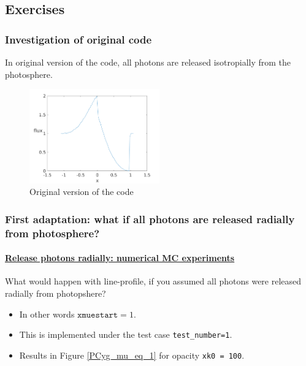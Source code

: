 \documentclass[../main/main.tex]{subfiles}
\begin{document}
\newpage
\subsection{Exercises}
\subsubsection{Investigation of original code}
In original version of the code, all photons are released isotropially from the photosphere.

\begin{figure}[!htp]
\centering
\includegraphics[width=0.5\textwidth]{../../introductory_exercises/P_Cygni_profile_UV_resonance/data/npot6xk0100alpha0beta1test0.png}
\caption{Original version of the code}
\end{figure}

\newpage
\subsubsection{First adaptation: what if all photons are released radially from photosphere?}
\label{PCYG FIRST adaptation}

\paragraph{\underline{Release photons radially: numerical MC experiments}}
What would happen with line-profile, if you assumed all photons
were released radially from photopshere?
\begin{itemize}
\item In other words $\texttt{xmuestart} = 1$. 
\item This is implemented under the test case \texttt{test\_number=1}.
\item Results in Figure \ref{PCyg_mu_eq_1} for opacity \texttt{xk0 = 100}.
\end{itemize}
\end{document}
